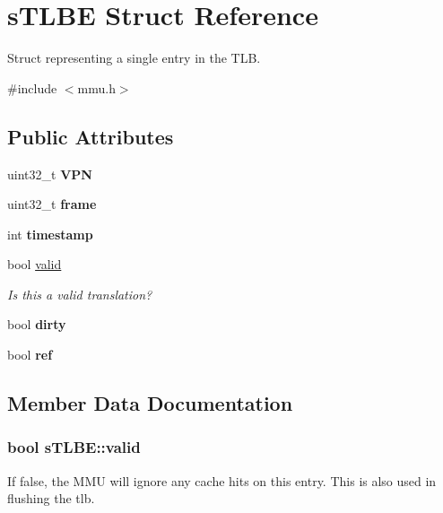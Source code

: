 \hypertarget{structsTLBE}{\section{s\-T\-L\-B\-E \-Struct \-Reference}
\label{d2/deb/structsTLBE}
}


\-Struct representing a single entry in the \-T\-L\-B.  




{\ttfamily \#include $<$mmu.\-h$>$}

\subsection*{\-Public \-Attributes}
\begin{DoxyCompactItemize}
\item 
\hypertarget{structsTLBE_a4010857b71377706a604c279ace18d01}{uint32\-\_\-t {\bfseries \-V\-P\-N}}\label{d2/deb/structsTLBE_a4010857b71377706a604c279ace18d01}

\item 
\hypertarget{structsTLBE_a4b59c05e37a16e8cae375f4196035c70}{uint32\-\_\-t {\bfseries frame}}\label{d2/deb/structsTLBE_a4b59c05e37a16e8cae375f4196035c70}

\item 
\hypertarget{structsTLBE_a1f482585fac2299e1c083bef6a5391ef}{int {\bfseries timestamp}}\label{d2/deb/structsTLBE_a1f482585fac2299e1c083bef6a5391ef}

\item 
bool \hyperlink{structsTLBE_a49cd068c40f5bb2698fb351d4356492e}{valid}
\begin{DoxyCompactList}\small\item\em \-Is this a valid translation? \end{DoxyCompactList}\item 
\hypertarget{structsTLBE_a9b13016950c8670388e23d5a818d3c53}{bool {\bfseries dirty}}\label{d2/deb/structsTLBE_a9b13016950c8670388e23d5a818d3c53}

\item 
\hypertarget{structsTLBE_a3d9f86a07a5cadff19239a7eaf713e71}{bool {\bfseries ref}}\label{d2/deb/structsTLBE_a3d9f86a07a5cadff19239a7eaf713e71}

\end{DoxyCompactItemize}


\subsection{\-Member \-Data \-Documentation}
\hypertarget{structsTLBE_a49cd068c40f5bb2698fb351d4356492e}{
\subsubsection[{valid}]{\setlength{\rightskip}{0pt plus 5cm}bool {\bf s\-T\-L\-B\-E\-::valid}}}\label{d2/deb/structsTLBE_a49cd068c40f5bb2698fb351d4356492e}
\-If false, the \-M\-M\-U will ignore any cache hits on this entry. \-This is also used in flushing the tlb. 

